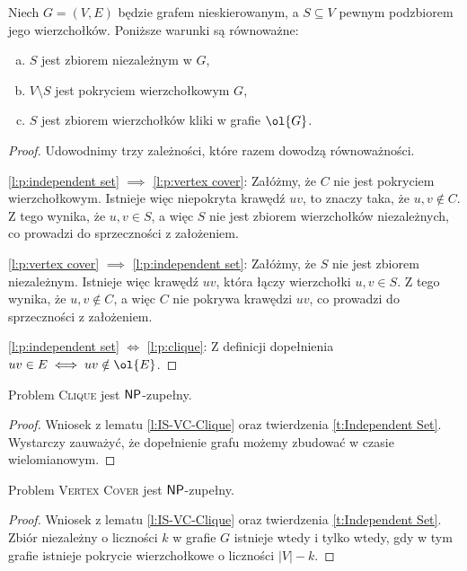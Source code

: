 \begin{lemma}\label{l:IS-VC-Clique}
    Niech $G = (V, E)$ będzie grafem nieskierowanym, a $S \subseteq V$ pewnym podzbiorem jego wierzchołków. Poniższe warunki są równoważne:
    \begin{enumerate}[(a)]
        \item \label{l:p:independent set} $S$ jest zbiorem niezależnym w $G$,
        \item \label{l:p:vertex cover} $V \setminus S$ jest pokryciem wierzchołkowym $G$,
        \item \label{l:p:clique} $S$ jest zbiorem wierzchołków kliki w grafie $\ol{G}$.
    \end{enumerate}
\end{lemma}
\begin{proof}
    Udowodnimy trzy zależności, które razem dowodzą równoważności.

    \ref{l:p:independent set} $\implies$ \ref{l:p:vertex cover}: Załóżmy, że $C$ nie jest pokryciem wierzchołkowym. Istnieje więc niepokryta krawędź $uv$, to znaczy taka, że $u, v \notin C$. Z tego wynika, że $u, v \in S$, a więc $S$ nie jest zbiorem wierzchołków niezależnych, co prowadzi do sprzeczności z założeniem.

    \ref{l:p:vertex cover} $\implies$ \ref{l:p:independent set}: Załóżmy, że $S$ nie jest zbiorem niezależnym. Istnieje więc krawędź $uv$, która łączy wierzchołki $u, v \in S$. Z tego wynika, że $u, v \notin C$, a więc $C$ nie pokrywa krawędzi $uv$, co prowadzi do sprzeczności z założeniem.

    \ref{l:p:independent set} $\iff$ \ref{l:p:clique}: Z definicji dopełnienia $uv \in E \iff uv \notin \ol{E}$.
\end{proof}

\begin{theorem}\label{t:Clique}
    Problem \textsc{Clique} jest $\textsf{NP}$-zupełny.
\end{theorem}
\begin{proof}
    Wniosek z lematu \ref{l:IS-VC-Clique} oraz twierdzenia \ref{t:Independent Set}. Wystarczy zauważyć, że dopełnienie grafu możemy zbudować w czasie wielomianowym.
\end{proof}

\begin{theorem}\label{t:Vertex Cover}
    Problem \textsc{Vertex Cover} jest $\textsf{NP}$-zupełny.
\end{theorem}
\begin{proof}
    Wniosek z lematu \ref{l:IS-VC-Clique} oraz twierdzenia \ref{t:Independent Set}. Zbiór niezależny o liczności $k$ w grafie $G$ istnieje wtedy i tylko wtedy, gdy w tym grafie istnieje pokrycie wierzchołkowe o liczności $|V| - k$.
\end{proof}

